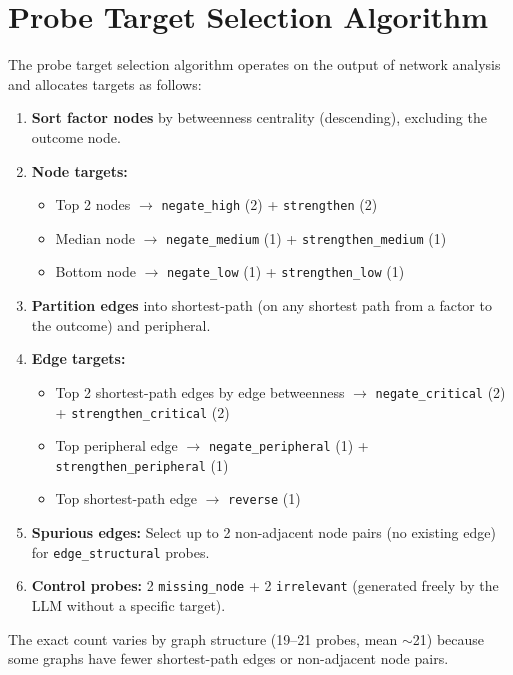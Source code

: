 \documentclass[11pt]{article}
\begin{document}
\section{Probe Target Selection Algorithm}
\label{app:target-selection}

The probe target selection algorithm operates on the output of network analysis and allocates targets as follows:

\begin{enumerate}
\item \textbf{Sort factor nodes} by betweenness centrality (descending), excluding the outcome node.
\item \textbf{Node targets:}
    \begin{itemize}
    \item Top 2 nodes $\rightarrow$ \texttt{negate\_high} (2) + \texttt{strengthen} (2)
    \item Median node $\rightarrow$ \texttt{negate\_medium} (1) + \texttt{strengthen\_medium} (1)
    \item Bottom node $\rightarrow$ \texttt{negate\_low} (1) + \texttt{strengthen\_low} (1)
    \end{itemize}
\item \textbf{Partition edges} into shortest-path (on any shortest path from a factor to the outcome) and peripheral.
\item \textbf{Edge targets:}
    \begin{itemize}
    \item Top 2 shortest-path edges by edge betweenness $\rightarrow$ \texttt{negate\_critical} (2) + \texttt{strengthen\_critical} (2)
    \item Top peripheral edge $\rightarrow$ \texttt{negate\_peripheral} (1) + \texttt{strengthen\_peripheral} (1)
    \item Top shortest-path edge $\rightarrow$ \texttt{reverse} (1)
    \end{itemize}
\item \textbf{Spurious edges:} Select up to 2 non-adjacent node pairs (no existing edge) for \texttt{edge\_structural} probes.
\item \textbf{Control probes:} 2 \texttt{missing\_node} + 2 \texttt{irrelevant} (generated freely by the LLM without a specific target).
\end{enumerate}

The exact count varies by graph structure (19--21 probes, mean ${\sim}$21) because some graphs have fewer shortest-path edges or non-adjacent node pairs.
\end{document}

